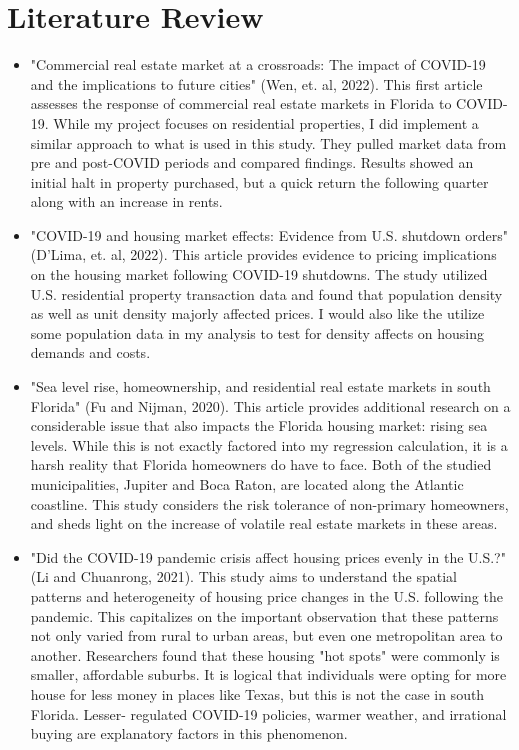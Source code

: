 \documentclass[12pt,english]{article}
\begin{document}
\section{Literature Review}\label{sec:litreview}
\begin{itemize}
\item "Commercial real estate market at a crossroads: The impact of COVID-19 and the implications to future cities" (Wen, et. al, 2022). This first article assesses the response of commercial real estate markets in Florida to COVID-19. While my project focuses on residential properties, I did implement a similar approach to what is used in this study. They pulled market data from pre and post-COVID periods and compared findings. Results showed an initial halt in property purchased, but a quick return the following quarter along with an increase in rents. 
\item "COVID-19 and housing market effects: Evidence from U.S. shutdown orders" (D'Lima, et. al, 2022). This article provides evidence to pricing implications on the housing market following COVID-19 shutdowns. The study utilized U.S. residential property transaction data and found that population density as well as unit density majorly affected prices. I would also like the utilize some population data in my analysis to test for density affects on housing demands and costs. 
\item "Sea level rise, homeownership, and residential real estate markets in south Florida" (Fu and Nijman, 2020). This article provides additional research on a considerable issue that also impacts the Florida housing market: rising sea levels. While this is not exactly factored into my regression calculation, it is a harsh reality that Florida homeowners do have to face. Both of the studied municipalities, Jupiter and Boca Raton, are located along the Atlantic coastline. This study considers the risk tolerance of non-primary homeowners, and sheds light on the increase of volatile real estate markets in these areas. 
\item "Did the COVID-19 pandemic crisis affect housing prices evenly in the U.S.?" (Li and Chuanrong, 2021). This study aims to understand the spatial patterns and  heterogeneity  of housing price changes in the U.S. following the pandemic. This capitalizes on the important observation that these patterns not only varied from rural to urban areas, but even one metropolitan area to another. Researchers found that these housing "hot spots" were commonly is smaller, affordable suburbs. It is logical that individuals were opting for more house for less money in places like Texas, but this is not the case in south Florida. Lesser- regulated COVID-19 policies, warmer weather, and irrational buying are explanatory factors in this phenomenon. 
\end{itemize}
\end{document}
